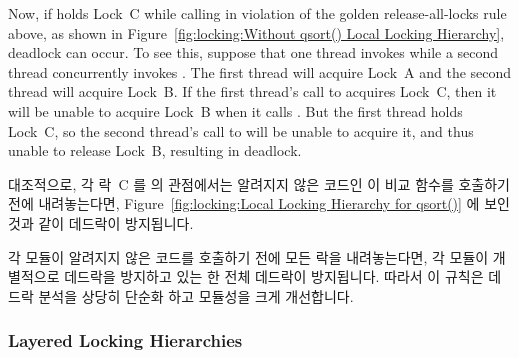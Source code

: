 Now, if  holds Lock~C while calling  in violation
of the golden release-all-locks rule above, as shown in
Figure~\ref{fig:locking:Without qsort() Local Locking Hierarchy},
deadlock can occur.
To see this, suppose that one thread invokes  while a second
thread concurrently invokes .
The first thread will acquire Lock~A and the second thread will acquire
Lock~B\@.
If the first thread's call to  acquires Lock~C, then it
will be unable to acquire Lock~B when it calls .
But the first thread holds Lock~C, so the second thread's call to
 will be unable to acquire it, and thus unable to release
Lock~B, resulting in deadlock.

\fi

대조적으로,  각 락~C 를  의 관점에서는 알려지지 않은
코드인 이 비교 함수를 호출하기 전에 내려놓는다면, 
Figure~\ref{fig:locking:Local Locking Hierarchy for qsort()} 에 보인 것과 같이
데드락이 방지됩니다.

각 모듈이 알려지지 않은 코드를 호출하기 전에 모든 락을 내려놓는다면, 각 모듈이
개별적으로 데드락을 방지하고 있는 한 전체 데드락이 방지됩니다.
따라서 이 규칙은 데드락 분석을 상당히 단순화 하고 모듈성을 크게 개선합니다.

\subsubsection{Layered Locking Hierarchies}
\label{sec:locking:Layered Locking Hierarchies}


